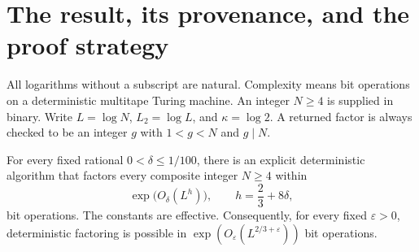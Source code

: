 \begin{abstract}
We give a deterministic integer-factorization algorithm with bit complexity
\(\exp(O_\varepsilon((\log N)^{2/3+\varepsilon}))\) for every fixed
\(\varepsilon>0\).  The construction modifies the exponent-annihilation
method in the pinned Cogentic manuscript on deterministic factoring.  Its
main ingredients are preconditioned polynomial pairs, squarefree smooth
values in arithmetic progressions, exact cancellation in two real-unit
lattices, and a supplied-exponent splitting algorithm.  We give an explicit
replacement parameter schedule and prove the uniform analytic transfer,
including the conditional Gaussian laws, exceptional-conductor estimates,
adaptive deletion argument, and final spectral lower bound.  A corrected
Perron estimate retains a term omitted from the source's displayed bound.
The algorithm uses finite enumeration and exact certificates; probability
is used to prove that a successful enumerated pair exists.  We also identify
the precise large-modulus obstruction in the present progression argument.
The result is a mathematical manuscript using stated classical inputs; it
does not assert verification of the source's formal-proof artifacts or an
endpoint \(L_N[2/3,c]\) bound.
\end{abstract}

\tableofcontents

\section{The result, its provenance, and the proof strategy}
\label{sec:introduction}

All logarithms without a subscript are natural.  Complexity means bit
operations on a deterministic multitape Turing machine.  An integer
\(N\ge4\) is supplied in binary.  Write \(L=\log N\), \(L_2=\log L\), and
\(\kappa=\log2\).  A returned factor is always checked to be an integer
\(g\) with \(1<g<N\) and \(g\mid N\).

\begin{theorem}\label{thm:main}
For every fixed rational \(0<\delta\le1/100\), there is an explicit
deterministic algorithm that factors every composite integer \(N\ge4\)
within
\[
 \exp\bigl(O_\delta(L^{h})\bigr),
 \qquad h=\frac23+8\delta,
\]
bit operations.  The constants are effective.  Consequently, for every
fixed \(\varepsilon>0\), deterministic factoring is possible in
\(\exp(O_\varepsilon(L^{2/3+\varepsilon}))\) bit operations.
\end{theorem}

